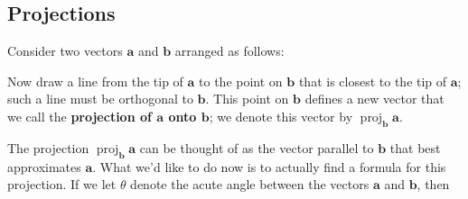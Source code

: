 \documentclass[10pt,]{book}
\newcommand{\terminology}[1]{\textbf{#1}}
\theoremstyle{ptxplainnotitle}
\theoremstyle{ptxplaintitle}
\theoremstyle{ptxplainnotitle}
\theoremstyle{ptxplaintitle}
\theoremstyle{ptxplainnotitle}
\theoremstyle{ptxplaintitle}
\theoremstyle{ptxdefinitionnotitle}
\theoremstyle{ptxdefinitiontitle}
\theoremstyle{ptxdefinitionnotitle}
\theoremstyle{ptxdefinitiontitle}
\theoremstyle{ptxdefinitionnotitle}
\theoremstyle{ptxdefinitiontitle}
\theoremstyle{ptxdefinitionnotitle}
\theoremstyle{ptxdefinitiontitle}
\theoremstyle{ptxdefinitionnotitle}
\theoremstyle{ptxdefinitiontitle}
\numberwithin{equation}{section}
\newcommand{\vv}[1]{\mathbf{#1}}
\newcommand{\proj}[2]{\operatorname{proj}_{#1} #2}
\begin{document}
\subsection[{Projections}]{Projections}\label{subsection-projections}
\hypertarget{p-810}{}%
Consider two vectors \(\vv{a}\) and \(\vv{b}\) arranged as follows:%
\begin{figure}
\centering
{
}
\end{figure}
\hypertarget{p-811}{}%
Now draw a line from the tip of \(\vv{a}\) to the point on \(\vv{b}\) that is closest to the tip of \(\vv{a}\); such a line must be orthogonal to \(\vv{b}\). This point on \(\vv{b}\) defines a new vector that we call the \terminology{projection of \(\vv{a}\) onto \(\vv{b}\)}; we denote this vector by \(\proj{\vv{b}}{\vv{a}}\).%
\begin{figure}
\centering
{
}
\end{figure}
\hypertarget{p-812}{}%
The projection \(\proj{\vv{b}}{\vv{a}}\) can be thought of as the vector parallel to \(\vv{b}\) that best approximates \(\vv{a}\). What we'd like to do now is to actually find a formula for this projection. If we let \(\theta\) denote the acute angle between the vectors \(\vv{a}\) and \(\vv{b}\), then%
\end{document}
